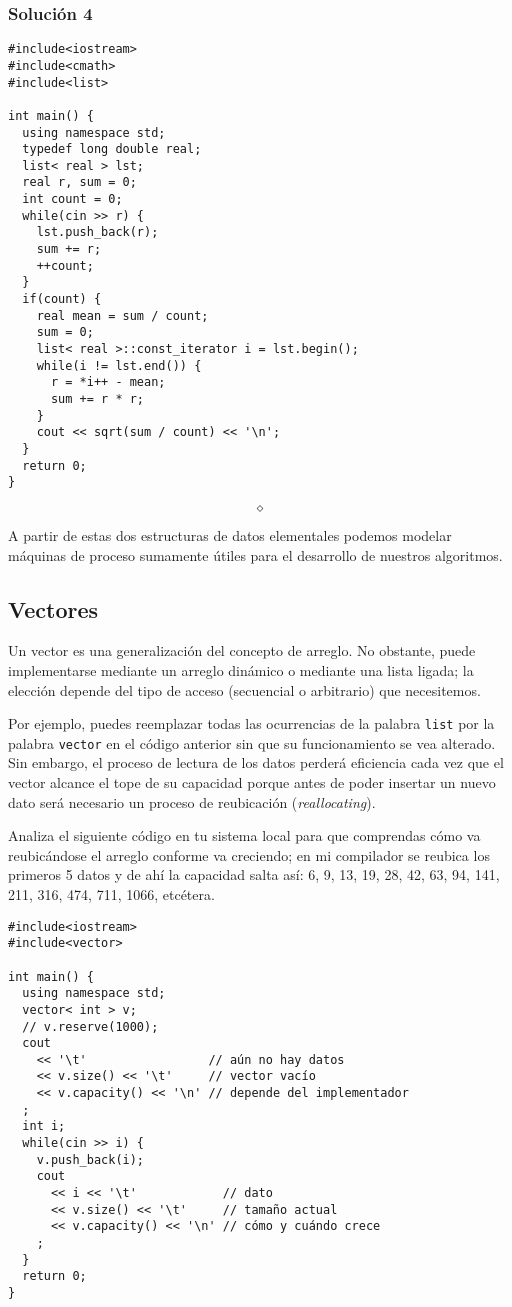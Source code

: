 \documentclass[10pt,letterpaper,twocolumn,spanish]{article}
\begin{document}
\subsubsection*{Solución 4}

\begin{verbatim}
#include<iostream>
#include<cmath>
#include<list>

int main() {
  using namespace std;
  typedef long double real;
  list< real > lst;
  real r, sum = 0;
  int count = 0;
  while(cin >> r) {
    lst.push_back(r);
    sum += r;
    ++count;
  }
  if(count) {
    real mean = sum / count;
    sum = 0;
    list< real >::const_iterator i = lst.begin();
    while(i != lst.end()) {
      r = *i++ - mean;
      sum += r * r;
    }
    cout << sqrt(sum / count) << '\n';
  }
  return 0;
}
\end{verbatim}

\[\diamond\]

A partir de estas dos estructuras de datos elementales podemos modelar máquinas de proceso sumamente útiles para el desarrollo de nuestros algoritmos.

\subsection*{Vectores}

Un vector es una generalización del concepto de arreglo. No obstante, puede implementarse mediante un arreglo dinámico o mediante una lista ligada; la elección depende del tipo de acceso (secuencial o arbitrario) que necesitemos.

Por ejemplo, puedes reemplazar todas las ocurrencias de la palabra \texttt{list} por la palabra \texttt{vector} en el código anterior sin que su funcionamiento se vea alterado. Sin embargo, el proceso de lectura de los datos perderá eficiencia cada vez que el vector alcance el tope de su capacidad porque antes de poder insertar un nuevo dato será necesario un proceso de reubicación (\textit{reallocating}).

Analiza el siguiente código en tu sistema local para que comprendas cómo va reubicándose el arreglo conforme va creciendo; en mi compilador se reubica los primeros 5 datos y de ahí la capacidad salta así: 6, 9, 13, 19, 28, 42, 63, 94, 141, 211, 316, 474, 711, 1066, etcétera.

\begin{verbatim}
#include<iostream>
#include<vector>

int main() {
  using namespace std;
  vector< int > v;
  // v.reserve(1000);
  cout
    << '\t'                 // aún no hay datos
    << v.size() << '\t'     // vector vacío
    << v.capacity() << '\n' // depende del implementador
  ;
  int i;
  while(cin >> i) {
    v.push_back(i);
    cout
      << i << '\t'            // dato
      << v.size() << '\t'     // tamaño actual
      << v.capacity() << '\n' // cómo y cuándo crece
    ;
  }
  return 0;
}
\end{verbatim}
\end{document}

